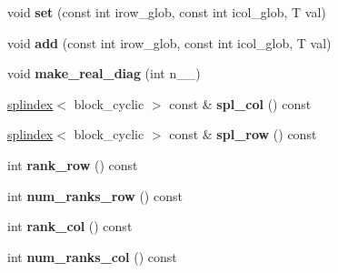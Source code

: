 \begin{DoxyCompactItemize}
\item 
\hypertarget{classsddk_1_1dmatrix_afc7fe5e8d018e998c57c315d1ed456a6}{}void {\bfseries set} (const int irow\+\_\+glob, const int icol\+\_\+glob, T val)\label{classsddk_1_1dmatrix_afc7fe5e8d018e998c57c315d1ed456a6}

\item 
\hypertarget{classsddk_1_1dmatrix_a3d7bc2d6971cc09951d9d691515de505}{}void {\bfseries add} (const int irow\+\_\+glob, const int icol\+\_\+glob, T val)\label{classsddk_1_1dmatrix_a3d7bc2d6971cc09951d9d691515de505}

\item 
\hypertarget{classsddk_1_1dmatrix_ae4285b17e0f7644830ff2ebca1a52185}{}void {\bfseries make\+\_\+real\+\_\+diag} (int n\+\_\+\+\_\+)\label{classsddk_1_1dmatrix_ae4285b17e0f7644830ff2ebca1a52185}

\item 
\hypertarget{classsddk_1_1dmatrix_a25f11dc2be3e5d260069fcc0af3eebda}{}\hyperlink{classsddk_1_1splindex}{splindex}$<$ block\+\_\+cyclic $>$ const \& {\bfseries spl\+\_\+col} () const \label{classsddk_1_1dmatrix_a25f11dc2be3e5d260069fcc0af3eebda}

\item 
\hypertarget{classsddk_1_1dmatrix_a9cc950876832ccef66e63727d36aaddd}{}\hyperlink{classsddk_1_1splindex}{splindex}$<$ block\+\_\+cyclic $>$ const \& {\bfseries spl\+\_\+row} () const \label{classsddk_1_1dmatrix_a9cc950876832ccef66e63727d36aaddd}

\item 
\hypertarget{classsddk_1_1dmatrix_a89d9203004e6b7090480992797c09b63}{}int {\bfseries rank\+\_\+row} () const \label{classsddk_1_1dmatrix_a89d9203004e6b7090480992797c09b63}

\item 
\hypertarget{classsddk_1_1dmatrix_ae79b5b590ecc7e72e6be36a4db9119e3}{}int {\bfseries num\+\_\+ranks\+\_\+row} () const \label{classsddk_1_1dmatrix_ae79b5b590ecc7e72e6be36a4db9119e3}

\item 
\hypertarget{classsddk_1_1dmatrix_a0718281a5056728cfe63c7933f7cd994}{}int {\bfseries rank\+\_\+col} () const \label{classsddk_1_1dmatrix_a0718281a5056728cfe63c7933f7cd994}

\item 
\hypertarget{classsddk_1_1dmatrix_ae7f2788f8161a67b9646a722df497948}{}int {\bfseries num\+\_\+ranks\+\_\+col} () const \label{classsddk_1_1dmatrix_ae7f2788f8161a67b9646a722df497948}


\end{DoxyCompactItemize}
